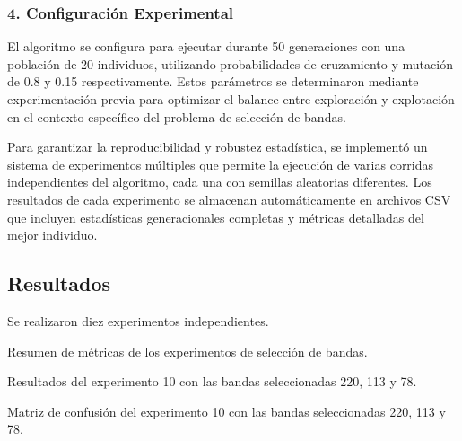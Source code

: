 \subsubsection{4. Configuración Experimental}

El algoritmo se configura para ejecutar durante 50 generaciones con una población de 20 individuos, utilizando probabilidades de cruzamiento y mutación de 0.8 y 0.15 respectivamente. Estos parámetros se determinaron mediante experimentación previa para optimizar el balance entre exploración y explotación en el contexto específico del problema de selección de bandas.

\vspace{5mm}

Para garantizar la reproducibilidad y robustez estadística, se implementó un sistema de experimentos múltiples que permite la ejecución de varias corridas independientes del algoritmo, cada una con semillas aleatorias diferentes. Los resultados de cada experimento se almacenan automáticamente en archivos CSV que incluyen estadísticas generacionales completas y métricas detalladas del mejor individuo.

\subsection{Resultados}

Se realizaron diez experimentos independientes.

\begin{table}[ht]
\centering
\caption{Resumen de métricas de los experimentos de selección de bandas.}
\label{tab:experiment_metrics}
\end{table}

\begin{table}[ht]
\centering
\caption{Resultados del experimento 10 con las bandas seleccionadas 220, 113 y 78.}
\label{tab:exp_10_cnn_results_220_113_78}
\end{table}

\begin{table}[ht]
\centering
\caption{Matriz de confusión del experimento 10 con las bandas seleccionadas 220, 113 y 78.}
\label{tab:exp_10_confusion_matrix_220_113_78}
\end{table}

